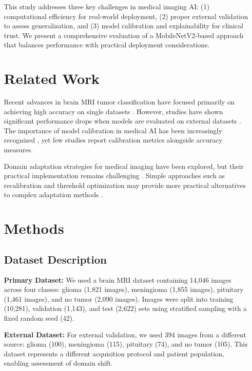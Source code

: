 \documentclass[11pt]{article}
\begin{document}
This study addresses three key challenges in medical imaging AI: (1) computational efficiency for real-world deployment, (2) proper external validation to assess generalization, and (3) model calibration and explainability for clinical trust. We present a comprehensive evaluation of a MobileNetV2-based approach that balances performance with practical deployment considerations.

\section{Related Work}

Recent advances in brain MRI tumor classification have focused primarily on achieving high accuracy on single datasets \cite{author2023}. However, studies have shown significant performance drops when models are evaluated on external datasets \cite{author2024}. The importance of model calibration in medical AI has been increasingly recognized \cite{author2025}, yet few studies report calibration metrics alongside accuracy measures.

Domain adaptation strategies for medical imaging have been explored, but their practical implementation remains challenging \cite{author2026}. Simple approaches such as recalibration and threshold optimization may provide more practical alternatives to complex adaptation methods \cite{author2027}.

\section{Methods}

\subsection{Dataset Description}

\textbf{Primary Dataset:} We used a brain MRI dataset containing 14,046 images across four classes: glioma (1,821 images), meningioma (1,855 images), pituitary (1,461 images), and no tumor (2,090 images). Images were split into training (10,281), validation (1,143), and test (2,622) sets using stratified sampling with a fixed random seed (42).

\textbf{External Dataset:} For external validation, we used 394 images from a different source: glioma (100), meningioma (115), pituitary (74), and no tumor (105). This dataset represents a different acquisition protocol and patient population, enabling assessment of domain shift.
\end{document}
